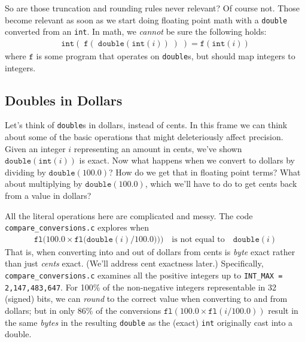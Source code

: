 \documentclass[11pt, oneside]{amsart}   	%
\begin{document}
So are those truncation and rounding rules never relevant? Of course not. Those become relevant as soon as we start doing floating point math with a \texttt{double} converted from an \texttt{int}. In math, we {\em cannot} be sure the following holds: 
\begin{align*}
    \texttt{int}(\; \texttt{f}(\; \texttt{double}(\texttt{int}(i)) \; )\; ) = \texttt{f}(\texttt{int}(i))
\end{align*}
where $\texttt{f}$ is some program that operates on \texttt{double}s, but should map integers to integers. 

\subsection{Doubles in Dollars}

Let's think of \texttt{double}s in dollars, instead of cents. In this frame we can think about some of the basic operations that might deleteriously affect precision. Given an integer $i$ representing an amount in cents, we've shown $\texttt{double}(\texttt{int}(i))$ is exact. Now what happens when we convert to dollars by dividing by $\texttt{double}(100.0)$? How do we get that in floating point terms? What about multiplying by $\texttt{double}(100.0)$, which we'll have to do to get cents back from a value in dollars? 

All the literal operations here are complicated and messy. The code \texttt{compare_conversions.c} explores when
\begin{align*}
    \texttt{fl}\Big(100.0\times\texttt{fl}\big(\texttt{double}(i)/100.0)\big)\Big)
    \quad\text{is not equal to}\quad
    \texttt{double}(i)
\end{align*}
That is, when converting into and out of dollars from cents is {\em byte} exact rather than just {\em cents} exact. (We'll address cent exactness later.) Specifically, \texttt{compare_conversions.c} examines all the positive integers up to \texttt{INT_MAX = 2,147,483,647}. For 100\% of the non-negative integers representable in 32 (signed) bits, we can {\em round} to the correct value when converting to and from dollars; but in only 86\% of the conversions $\texttt{fl}(100.0 \times \texttt{fl}(i/100.0))$ result in the same {\em bytes} in the resulting \texttt{double} as the (exact) \texttt{int} originally cast into a double. 
\end{document}

